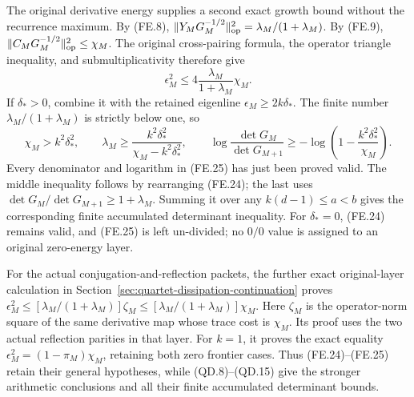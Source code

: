 The original derivative energy supplies a second exact growth bound
without the recurrence maximum.  By (FE.8),
\(\|Y_MG_M^{-1/2}\|_{\rm op}^2
=\lambda_M/(1+\lambda_M)\).  By (FE.9),
\(\|C_MG_M^{-1/2}\|_{\rm op}^2\le\chi_M\).
The original cross-pairing formula, the operator triangle inequality,
and submultiplicativity therefore give
\[
 \epsilon_M^2\le4\frac{\lambda_M}{1+\lambda_M}\chi_M.
 \tag{FE.24}
\]
If \(\delta_*>0\), combine it with the retained eigenline
\(\epsilon_M\ge2k\delta_*\).  The finite number
\(\lambda_M/(1+\lambda_M)\) is strictly below one, so
\[
 \chi_M>k^2\delta_*^2,\qquad
 \lambda_M\ge
       \frac{k^2\delta_*^2}{\chi_M-k^2\delta_*^2},\qquad
 \log\frac{\det G_M}{\det G_{M+1}}
       \ge-\log\left(1-\frac{k^2\delta_*^2}{\chi_M}\right).
 \tag{FE.25}
\]
Every denominator and logarithm in (FE.25) has just been proved
valid.  The middle inequality follows by rearranging (FE.24);
the last uses \(\det G_M/\det G_{M+1}\ge1+\lambda_M\).
Summing it over any \(k(d-1)\le a<b\) gives the corresponding
finite accumulated determinant inequality.  For \(\delta_*=0\),
(FE.24) remains valid, and (FE.25) is left un-divided; no
\(0/0\) value is assigned to an original zero-energy layer.


For the actual conjugation-and-reflection packets, the further exact
original-layer calculation in Section~\ref{sec:quartet-dissipation-continuation}
proves \(\epsilon_M^2\le[\lambda_M/(1+\lambda_M)]\zeta_M
\le[\lambda_M/(1+\lambda_M)]\chi_M\). Here \(\zeta_M\) is the
operator-norm square of the same derivative map whose trace cost is
\(\chi_M\). Its proof uses the two actual reflection parities in
that layer. For \(k=1\), it proves the exact equality
\(\epsilon_M^2=(1-\pi_M)\chi_M\), retaining both zero frontier
cases. Thus (FE.24)--(FE.25) retain their general hypotheses, while
(QD.8)--(QD.15) give the stronger arithmetic conclusions and all
their finite accumulated determinant bounds.
